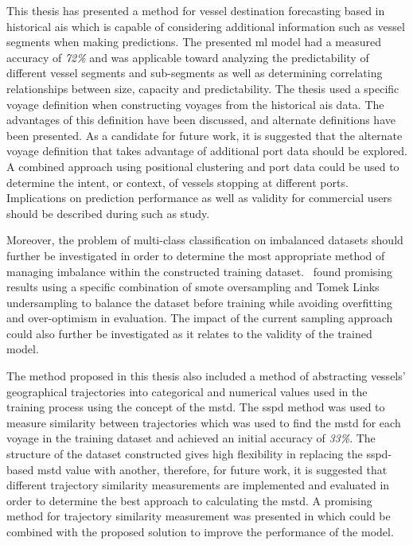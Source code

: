 This thesis has presented a method for vessel destination forecasting based in historical \acrshort{ais} which is capable of considering additional information such as vessel segments when making predictions. The presented \acrfull{ml} model had a measured accuracy of \textit{72\%} and was applicable toward analyzing the predictability of different vessel segments and sub-segments as well as determining correlating relationships between size, capacity and predictability. The thesis used a specific voyage definition when constructing voyages from the historical \acrshort{ais} data. The advantages of this definition have been discussed, and alternate definitions have been presented. As a candidate for future work, it is suggested that the alternate voyage definition that takes advantage of additional port data should be explored. A combined approach using positional clustering and port data could be used to determine the intent, or context, of vessels stopping at different ports. Implications on prediction performance as well as validity for commercial users should be described during such as study.

Moreover, the problem of multi-class classification on imbalanced datasets should further be investigated in order to determine the most appropriate method of managing imbalance within the constructed training dataset.~\cite{cv_imbalance} found promising results using a specific combination of \acrshort{smote} oversampling and Tomek Links undersampling to balance the dataset before training while avoiding overfitting and over-optimism in evaluation. The impact of the current sampling approach could also further be investigated as it relates to the validity of the trained model.

The method proposed in this thesis also included a method of abstracting vessels' geographical trajectories into categorical and numerical values used in the training process using the concept of the \acrfull{mstd}. The \acrfull{sspd} method was used to measure similarity between trajectories which was used to find the \acrshort{mstd} for each voyage in the training dataset and achieved an initial accuracy of \textit{33\%}. The structure of the dataset constructed gives high flexibility in replacing the \acrshort{sspd}-based \acrshort{mstd} value with another, therefore, for future work, it is suggested that different trajectory similarity measurements are implemented and evaluated in order to determine the best approach to calculating the \acrshort{mstd}. A promising method for trajectory similarity measurement was presented in \cite{Zhang2020AISApproach} which could be combined with the proposed solution to improve the performance of the model.

